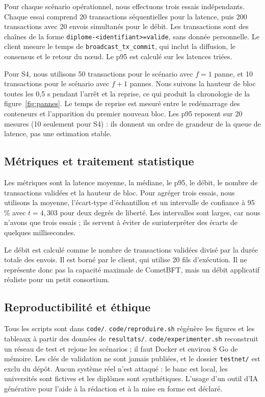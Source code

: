 \documentclass[conference]{IEEEtran}
\begin{document}
Pour chaque scénario opérationnel, nous effectuons trois essais indépendants. Chaque essai comprend 20 transactions séquentielles pour la latence, puis 200 transactions avec 20 envois simultanés pour le débit. Les transactions sont des chaînes de la forme \texttt{diplome-<identifiant>=valide}, sans donnée personnelle. Le client mesure le temps de \texttt{broadcast\_tx\_commit}, qui inclut la diffusion, le consensus et le retour du nœud. Le p95 est calculé sur les latences triées.

Pour S4, nous utilisons 50 transactions pour le scénario avec $f=1$ panne, et 10 transactions pour le scénario avec $f+1$ pannes. Nous suivons la hauteur de bloc toutes les 0,5 s pendant l'arrêt et la reprise, ce qui produit la chronologie de la figure~\ref{fig:pannes}. Le temps de reprise est mesuré entre le redémarrage des conteneurs et l'apparition du premier nouveau bloc. Les p95 reposent sur 20 mesures (10 seulement pour S4) : ils donnent un ordre de grandeur de la queue de latence, pas une estimation stable.

\subsection{Métriques et traitement statistique}

Les métriques sont la latence moyenne, la médiane, le p95, le débit, le nombre de transactions validées et la hauteur de bloc. Pour agréger trois essais, nous utilisons la moyenne, l'écart-type d'échantillon et un intervalle de confiance à 95 \% avec $t=4{,}303$ pour deux degrés de liberté. Les intervalles sont larges, car nous n'avons que trois essais ; ils servent à éviter de surinterpréter des écarts de quelques millisecondes.

Le débit est calculé comme le nombre de transactions validées divisé par la durée totale des envois. Il est borné par le client, qui utilise 20 fils d'exécution. Il ne représente donc pas la capacité maximale de CometBFT, mais un débit applicatif réaliste pour un petit consortium.

\subsection{Reproductibilité et éthique}

Tous les scripts sont dans \texttt{code/}. \texttt{code/reproduire.sh} régénère les figures et les tableaux à partir des données de \texttt{resultats/}. \texttt{code/experimenter.sh} reconstruit un réseau de test et rejoue les scénarios ; il faut Docker et environ 8 Go de mémoire. Les clés de validation ne sont jamais publiées, et le dossier \texttt{testnet/} est exclu du dépôt. Aucun système réel n'est attaqué : le banc est local, les universités sont fictives et les diplômes sont synthétiques. L'usage d'un outil d'IA générative pour l'aide à la rédaction et à la mise en forme est déclaré.
\end{document}
